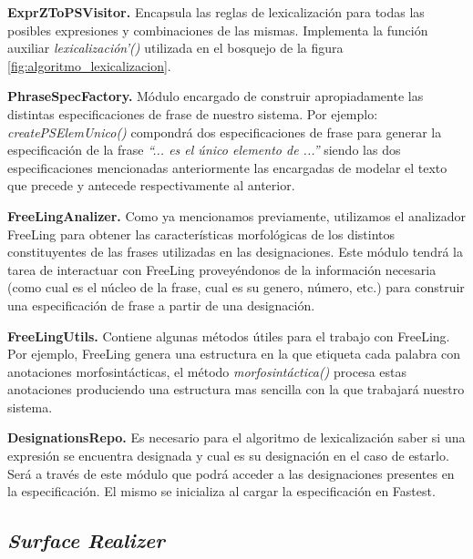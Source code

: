 \bigskip
\noindent
\textbf{ExprZToPSVisitor.} Encapsula las reglas de lexicalización para todas las posibles expresiones y combinaciones de las mismas. Implementa la función auxiliar \textit{lexicalización'()} utilizada en el bosquejo de la figura \ref{fig:algoritmo_lexicalizacion}.

\bigskip
\noindent
\textbf{PhraseSpecFactory.} Módulo encargado de construir apropiadamente las distintas especificaciones de frase de nuestro sistema. Por ejemplo: \textit{createPSElemUnico()} compondrá dos especificaciones de frase para generar la especificación de la frase \textit{``... es el único elemento de ...''} siendo las dos especificaciones mencionadas anteriormente las encargadas de modelar el texto que precede y antecede respectivamente al anterior.

\bigskip
\noindent
\textbf{FreeLingAnalizer.} Como ya mencionamos previamente, utilizamos el analizador FreeLing para obtener las características morfológicas de los distintos constituyentes de las frases utilizadas en las designaciones. Este módulo tendrá la tarea de interactuar con FreeLing proveyéndonos de la información necesaria (como cual es el núcleo de la frase, cual es su genero, número, etc.) para construir una especificación de frase a partir de una designación.

\bigskip
\noindent
\textbf{FreeLingUtils.} Contiene algunas métodos útiles para el trabajo con FreeLing. Por ejemplo, FreeLing genera una estructura en la que etiqueta cada palabra con anotaciones morfosintácticas, el método \textit{morfosintáctica()} procesa estas anotaciones produciendo una estructura mas sencilla con la que trabajará nuestro sistema.

\bigskip
\noindent
\textbf{DesignationsRepo.} Es necesario para el algoritmo de lexicalización saber si una expresión se encuentra designada y cual es su designación en el caso de estarlo. Será a través de este módulo que podrá acceder a las designaciones presentes en la especificación. El mismo se inicializa al cargar la especificación en Fastest. 

\subsection{\textit{Surface Realizer}}

